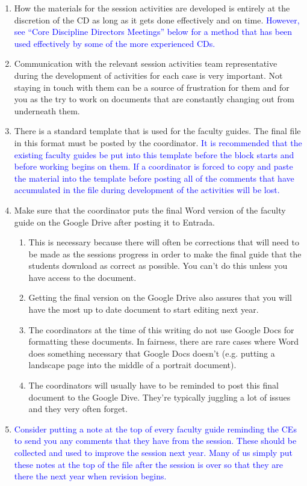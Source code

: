 \documentclass[11pt]{article}
\newcommand{\trsem}[1]{\textcolor{blue}{#1}}
\begin{document}
\begin{enumerate}
\begin{enumerate}
  \end{enumerate}
\item How the materials for the session activities are developed is entirely at the discretion of the CD as long as it gets done effectively and on time.  \trsem{However, see ``Core Discipline Directors Meetings'' below for a method that has been used effectively by some of the more experienced CDs.}
\item Communication with the relevant session activities team representative during the development of activities for each case is very important.  Not staying in touch with them can be a source of frustration for them and for you as the try to work on documents that are constantly changing out from underneath them.
\item There is a standard template that is used for the faculty guides.  The final file in this format must be posted by the coordinator.  \trsem{It is recommended that the existing faculty guides be put into this template before the block starts and before working begins on them.  If a coordinator is forced to copy and paste the material into the template before posting all of the comments that have accumulated in the file during development of the activities will be lost.}
\item Make sure that the coordinator puts the final Word version of the faculty guide on the Google Drive after posting it to Entrada.
  \begin{enumerate}
  \item This is necessary because there will often be corrections that will need to be made as the sessions progress in order to make the final guide that the students download as correct as possible.  You can't do this unless you have access to the document.
  \item Getting the final version on the Google Drive also assures that you will have the most up to date document to start editing next year.
  \item The coordinators at the time of this writing do not use Google Docs for formatting these documents.  In fairness, there are rare cases where Word does something necessary that Google Docs doesn't (e.g. putting a landscape page into the middle of a portrait document).
  \item The coordinators will usually have to be reminded to post this final document to the Google Dive.  They're typically juggling a lot of issues and they very often forget.
  \end{enumerate}
    \def\labelenumi{\trsem{\arabic{enumi}.}}
\item \trsem{Consider putting a note at the top of every faculty guide reminding the CEs to send you any comments that they have from the session.  These should be collected and used to improve the session next year.  Many of us simply put these notes at the top of the file after the session is over so that they are there the next year when revision begins.}
\end{enumerate}
\end{document}

